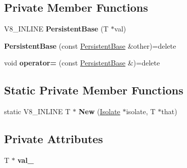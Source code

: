 \subsection*{Private Member Functions}
\begin{DoxyCompactItemize}
\item 
V8\+\_\+\+I\+N\+L\+I\+NE {\bfseries Persistent\+Base} (T $\ast$val)\hypertarget{classv8_1_1_persistent_base_a69c26b1d8849c8905a162db8f058cf0e}{}\label{classv8_1_1_persistent_base_a69c26b1d8849c8905a162db8f058cf0e}

\item 
{\bfseries Persistent\+Base} (const \hyperlink{classv8_1_1_persistent_base}{Persistent\+Base} \&other)=delete\hypertarget{classv8_1_1_persistent_base_aa403ece93fda904f5d6ab39e9383a504}{}\label{classv8_1_1_persistent_base_aa403ece93fda904f5d6ab39e9383a504}

\item 
void {\bfseries operator=} (const \hyperlink{classv8_1_1_persistent_base}{Persistent\+Base} \&)=delete\hypertarget{classv8_1_1_persistent_base_ada3d83b8cadaf4b83027baa41cd99d8c}{}\label{classv8_1_1_persistent_base_ada3d83b8cadaf4b83027baa41cd99d8c}

\end{DoxyCompactItemize}
\subsection*{Static Private Member Functions}
\begin{DoxyCompactItemize}
\item 
static V8\+\_\+\+I\+N\+L\+I\+NE T $\ast$ {\bfseries New} (\hyperlink{classv8_1_1_isolate}{Isolate} $\ast$isolate, T $\ast$that)\hypertarget{classv8_1_1_persistent_base_ae5d4014fe651f1d7753c96147b04dd00}{}\label{classv8_1_1_persistent_base_ae5d4014fe651f1d7753c96147b04dd00}

\end{DoxyCompactItemize}
\subsection*{Private Attributes}
\begin{DoxyCompactItemize}
\item 
T $\ast$ {\bfseries val\+\_\+}\hypertarget{classv8_1_1_persistent_base_a380d24a680b9112e999dccf51d7e2d68}{}\label{classv8_1_1_persistent_base_a380d24a680b9112e999dccf51d7e2d68}

\end{DoxyCompactItemize}
